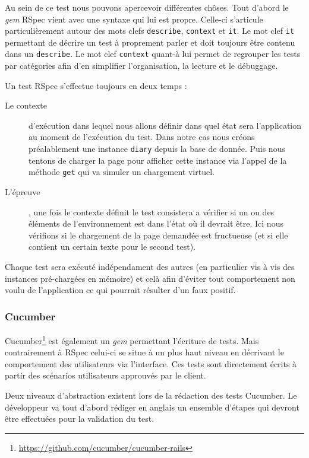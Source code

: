 \documentclass[12pt,a4paper]{book}
\begin{document}
Au sein de ce test nous pouvons apercevoir différentes chôses. Tout d'abord le \textit{gem} RSpec vient avec une syntaxe qui lui est propre. Celle-ci s'articule particulièrement autour des mots clefs \texttt{describe}, \texttt{context} et \texttt{it}. Le mot clef \texttt{it} permettant de décrire un test à proprement parler et doit toujours être contenu dans un \texttt{describe}. Le mot clef \texttt{context} quant-à lui permet de regrouper les tests par catégories afin d'en simplifier l'organisation, la lecture et le débuggage.

Un test RSpec s'effectue toujours en deux temps :
\begin{description}
	\item[Le contexte] d'exécution dans lequel nous allons définir dans quel état sera l'application au moment de l'exécution du test. Dans notre cas nous créons préalablement une instance \texttt{diary} depuis la base de donnée. Puis nous tentons de charger la page pour afficher cette instance via l'appel de la méthode \texttt{get} qui va simuler un chargement virtuel.
	\item[L'épreuve], une fois le contexte définit le test consistera a vérifier si un ou des éléments de l'environnement est dans l'état où il devrait être. Ici nous vérifions si le chargement de la page demandée est fructueuse (et si elle contient un certain texte pour le second test).
\end{description}

Chaque test sera exécuté indépendament des autres (en particulier vis à vis des instances pré-chargées en mémoire) et celà afin d'éviter tout comportement non voulu de l'application ce qui pourrait résulter d'un faux positif.

\subsubsection{Cucumber}

Cucumber\footnote{\url{https://github.com/cucumber/cucumber-rails}} est également un \textit{gem} permettant l'écriture de tests. Mais contrairement à RSpec celui-ci se situe à un plus haut niveau en décrivant le comportement des utilisateurs via l'interface. Ces tests sont directement écrits à partir des scénarios utilisateurs approuvés par le client.

Deux niveaux d'abstraction existent lors de la rédaction des tests Cucumber. Le développeur va tout d'abord rédiger en anglais un ensemble d'étapes qui devront être effectuées pour la validation du test.
\end{document}

